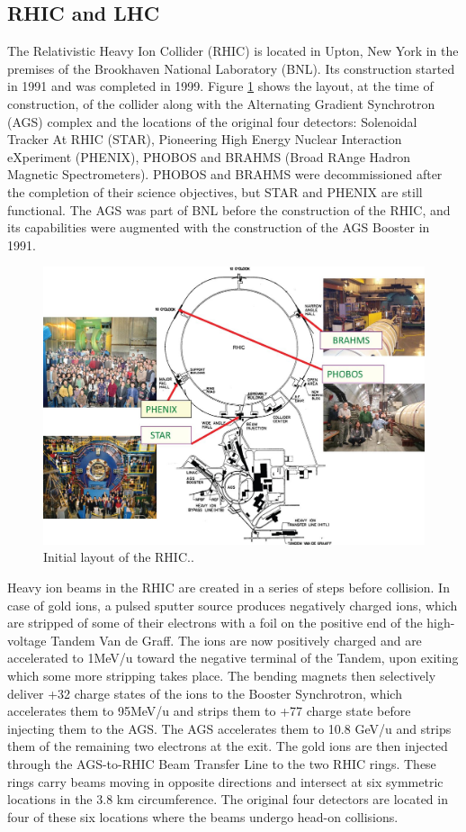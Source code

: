 \subsection{RHIC and LHC}
The Relativistic Heavy Ion Collider (RHIC) is located in Upton, New York in the premises of the Brookhaven National Laboratory (BNL). Its construction started in 1991 and was completed in 1999. Figure \ref{fig:RHIC_layout} shows the layout, at the time of construction, of the collider along with the Alternating Gradient Synchrotron (AGS) complex and the locations of the original four detectors: Solenoidal Tracker At RHIC (STAR), Pioneering High Energy Nuclear Interaction eXperiment (PHENIX), PHOBOS and BRAHMS (Broad RAnge Hadron Magnetic Spectrometers). PHOBOS and BRAHMS were decommissioned after the completion of their science objectives, but STAR and PHENIX are still functional. The AGS was part of BNL before the construction of the RHIC, and its capabilities were augmented with the construction of the AGS Booster in 1991.
\begin{figure}[h]
  \centering
  \includegraphics[width=6.5in]{figures/RHIC_Layout.jpeg}
  \caption{Initial layout of the RHIC.\cite{doi:10.1093/ptep/ptu093}.}\label{fig:RHIC_layout}
\end{figure}

Heavy ion beams in the RHIC are created in a series of steps before collision. In case of gold ions, a pulsed sputter source produces negatively charged ions, which are stripped of some of their electrons with a foil on the positive end of the high-voltage Tandem Van de Graff. The ions are now positively charged and are accelerated to 1MeV/u toward the negative terminal of the Tandem, upon exiting which some more stripping takes place. The bending magnets then selectively deliver +32 charge states of the ions to the Booster Synchrotron, which accelerates them to 95MeV/u and strips them to +77 charge state before injecting them to the AGS. The AGS accelerates them to 10.8 GeV/u and strips them of the remaining two electrons at the exit. The gold ions are then injected through the AGS-to-RHIC Beam Transfer Line to the two RHIC rings. These rings carry beams moving in opposite directions and intersect at six symmetric locations in the 3.8 km circumference. The original four detectors are located in four of these six locations where the beams undergo head-on collisions.

